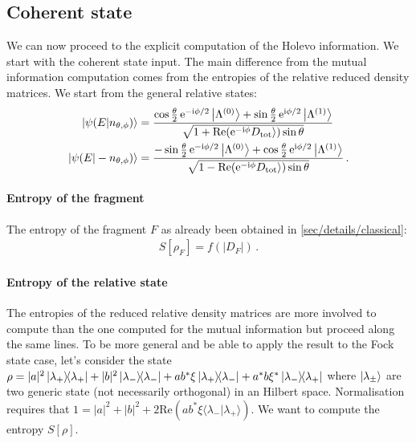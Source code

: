 \subsection{Coherent state}
\label{sec/holev/coherent}

We can now proceed to the explicit computation of the Holevo information.
We start with the coherent state input. The main difference from the
mutual information computation comes from the entropies of the
relative reduced density matrices. We start from the general relative
states:
%
\begin{align}
\ket{\psi(E|n_{\theta,\phi})} &= 
	\frac{\cos\frac{\theta}{2} \, \mathrm{e}^{-\mathrm{i} \phi/2} \ket{\Lambda^{(0)}} + 
	\sin\frac{\theta}{2} \, \mathrm{e}^{\mathrm{i} \phi/2} \ket{\Lambda^{(1)}}}{\sqrt{
	1 +\text{Re}(\mathrm{e}^{-\mathrm{i}\phi} D_{\text{tot}} \rangle ) \sin\theta}}
\\
\ket{\psi(E|-n_{\theta,\phi})} &= 
	\frac{-\sin\frac{\theta}{2} \, \mathrm{e}^{-\mathrm{i} \phi/2} \ket{\Lambda^{(0)}} + 
	\cos\frac{\theta}{2} \, \mathrm{e}^{\mathrm{i} \phi/2} \ket{\Lambda^{(1)}}}{\sqrt{
	1 -\text{Re}(\mathrm{e}^{-\mathrm{i}\phi} D_{\text{tot}} \rangle ) \sin\theta}}
\,.
\end{align}

\paragraph{Entropy of the fragment} The entropy of the fragment $F$ 
as already been obtained in \cref{sec/details/classical}:
%
\begin{align}
S[\rho_F] = f(|D_F|)
\,.
\end{align}

\paragraph{Entropy of the relative state} The entropies of the reduced 
relative density matrices are more involved to compute than the one computed for 
the mutual information but proceed along the same lines. To be more
general and be able to apply the result to the Fock state case, let's 
consider the state $\rho = |a|^2\ketbra{\lambda_+}{\lambda_+}
+ |b|^2\ketbra{\lambda_-}{\lambda_-} + 
ab^*\xi\ketbra{\lambda_+}{\lambda_-} + 
a^*b\xi^*\ketbra{\lambda_-}{\lambda_+}$ where $\ket{\lambda_\pm}$ are
two generic state (not necessarily orthogonal) in an Hilbert space. Normalisation
requires that 
$1 = |a|^2 + |b|^2 + 2 \text{Re}(ab^*\xi\langle\lambda_-|\lambda_+\rangle)$.
We want to compute the entropy $S[\rho]$.

